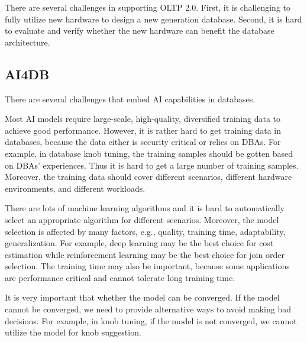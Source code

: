 There are several challenges in supporting OLTP 2.0. First, it is challenging to fully utilize new hardware to design a new generation database. Second, it is hard to evaluate and verify whether the new hardware can benefit the database architecture. 








\subsection{AI4DB}

There are several challenges that embed AI capabilities in databases. 

 Most AI models require large-scale, high-quality, diversified training data to achieve good performance. However, it is rather hard to get training data in databases, because the data either is security critical or relies on DBAs. For example, in database knob tuning, the training samples should be gotten based on DBAs' experiences. Thus it is hard to get a large number of training samples. Moreover, the training data should cover different scenarios, different hardware environments, and different workloads.  


 There are lots of machine learning algorithms and it is hard to automatically select an appropriate algorithm for different scenarios. Moreover, the model selection is affected by many factors, e.g., quality, training time, adaptability, generalization. For example, deep learning may be the best choice for cost estimation while reinforcement learning may be the best choice for join order selection. The training time may also be important, because some applications are performance critical and cannot tolerate long training time. 


 It is very important that whether the model can be converged. If the model cannot be converged, we need to provide alternative ways to avoid making bad decisions. For example, in knob tuning, if the model is not converged, we cannot utilize the model for knob suggestion.   
 

